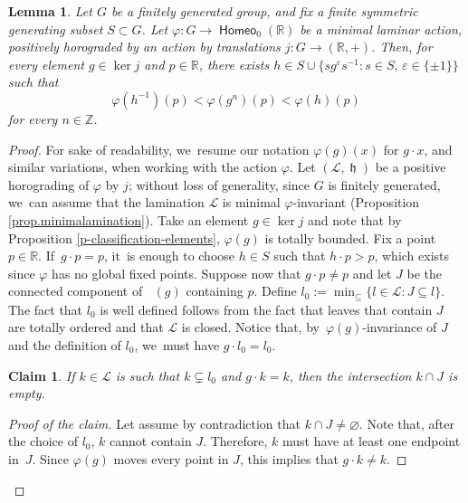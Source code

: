 \documentclass[JEP,XML,SOM,Unicode,NoFloatCountersInSection,published]{cedram}
\let\epsilon\varepsilon
\newtheorem{claimnum}{Claim}
\newtheorem{lem}[thm]{Lemma}
\theoremstyle{definition}
\DeclareMathOperator{\homeo}{\mathsf{Homeo}}
\DeclareMathOperator{\hor}{\mathfrak{h}}
\DeclareMathOperator{\suppphi}{\mathsf{Supp}^\varphi}
\newcommand{\R}{\mathbb{R}}
\newcommand{\Z}{\mathbb Z}
\newcommand{\Lcal}{\mathcal{L}}
\begin{document}
\begin{lem}\label{lem.domination}
Let $G$ be a finitely generated group, and fix a finite symmetric generating subset $S\subset G$. Let $\varphi\colon G\to\homeo_0(\R)$ be a minimal laminar action, positively horograded by an action by translations $j\colon G\to (\R,+)$. Then, for every element $g\in \ker j$ and $p\in\R$, there exists $h\in S\cup \bigl\{sg^\epsilon s^{-1}:s\in S,\, \epsilon\in \{\pm 1\}\bigr\}$ such that
\[
\varphi(h^{-1})(p)<\varphi(g^n)(p)<\varphi(h)(p)
\]
for every $n\in\Z$.
\end{lem}
\begin{proof}
For sake of readability, we~resume our notation $\varphi(g)(x)$ for $g\cdot x$, and similar variations, when working with the action $\varphi$.
Let $(\Lcal, \hor)$ be a positive horograding of $\varphi$ by $j$; without loss of generality, since $G$ is finitely generated, we~can assume that the lamination $\mathcal L$ is minimal $\varphi$-invariant (Proposition \ref{prop.minimalamination}). Take an element $g\in \ker j$ and note that by Proposition \ref{p-classification-elements}, $\varphi(g)$ is totally bounded. Fix a point $p\in\R$. If~$g\cdot p=p$, it~is enough to choose $h\in S$ such that $h\cdot p>p$, which exists since $\varphi$ has no global fixed points. Suppose now that $g\cdot p\neq p$ and let $J$ be the connected component of $\suppphi(g)$ containing $p$. Define $l_0:=\min_{\subseteq}\{l\in\Lcal:J\subseteq l\}$. The fact that $l_0$ is well defined follows from the fact that leaves that contain $J$ are totally ordered and that $\Lcal$ is closed. Notice that, by~$\varphi(g)$-invariance of ${J}$ and the definition of $l_0$, we~must have $g\cdot l_0=l_0$.

\begin{claimnum}\label{sublem.fix}
If $k\in \mathcal L$ is such that $k\subsetneq l_0$ and $g\cdot k=k$, then the intersection $k\cap J$ is empty.
\end{claimnum}
\begin{proof}[Proof of the claim]
Let assume by contradiction that $k\cap J\neq \varnothing$. Note that, after the choice of $l_0$, $k$ cannot contain $J$. Therefore, $k$ must have at least one endpoint in~$J$. Since $\varphi(g)$ moves every point in $J$, this implies that $g\cdot k\neq k$.
\end{proof}


\end{proof}
\end{document}
